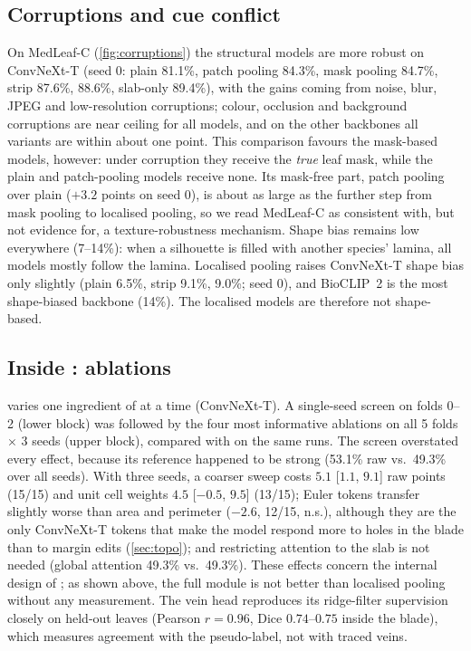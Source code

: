 \subsection{Corruptions and cue conflict}
On MedLeaf-C (\cref{fig:corruptions}) the structural models are more robust on ConvNeXt-T (seed 0: plain 81.1\%,
patch pooling 84.3\%, mask pooling 84.7\%, strip 87.6\%, \SVA{} 88.6\%, slab-only 89.4\%), with the gains
coming from noise, blur, JPEG and low-resolution corruptions; colour, occlusion and background
corruptions are near ceiling for all models, and on the other backbones all variants are within about
one point. This comparison favours the mask-based models, however: under corruption they receive the
\emph{true} leaf mask, while the plain and patch-pooling models receive none. Its mask-free part, patch
pooling over plain ($+3.2$ points on seed 0), is about as large as the further step from mask pooling to
localised pooling, so we read MedLeaf-C as consistent with, but not evidence for, a texture-robustness
mechanism. Shape bias remains low everywhere (7--14\%): when a silhouette is filled with another
species' lamina, all models mostly follow the lamina. Localised pooling raises ConvNeXt-T shape bias
only slightly (plain 6.5\%, strip 9.1\%, \SVA{} 9.0\%; seed 0), and BioCLIP~2 is the most shape-biased
backbone (14\%). The localised models are therefore not shape-based.


\subsection{Inside \SVA{}: ablations}
\label{sec:abl}
 varies one ingredient of \SVA{} at a time (ConvNeXt-T). A single-seed screen on folds
0--2 (lower block) was followed by the four most informative ablations on all 5 folds $\times$ 3
seeds (upper block), compared with \SVA{} on the same runs. The screen overstated every effect,
because its \SVA{} reference happened to be strong (53.1\% raw vs.\ 49.3\% over all seeds). With
three seeds, a coarser sweep costs $5.1$ [$1.1$, $9.1$] raw points (15/15) and unit cell weights
$4.5$ [$-0.5$, $9.5$] (13/15); Euler tokens transfer slightly worse than area and perimeter ($-2.6$,
12/15, n.s.), although they are the only ConvNeXt-T tokens that make the model respond more to holes in
the blade than to margin edits (\cref{sec:topo}); and restricting attention to the slab is not needed (global attention 49.3\% vs.\
49.3\%). These effects concern the internal design of \SVA{}; as shown above, the full module is not
better than localised pooling without any measurement. The vein head reproduces its ridge-filter
supervision closely on held-out leaves (Pearson $r=0.96$, Dice $0.74$--$0.75$ inside the blade),
which measures agreement with the pseudo-label, not with traced veins.



